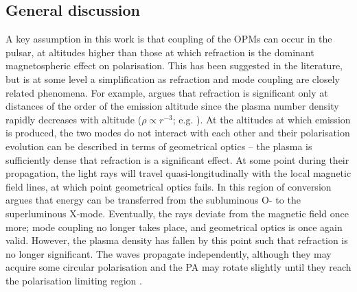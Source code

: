 







\subsection{General discussion}
\label{sec: B0031 - discuss - general discusison}

A key assumption in this work is that coupling of the OPMs can occur in the pulsar, at altitudes higher than those at which refraction is the dominant magnetospheric effect on polarisation. This has been suggested in the literature, but is at some level a simplification as refraction and mode coupling are closely related phenomena. For example, \citet{Pxxx2001} argues that refraction is significant only at distances of the order of the emission altitude since the plasma number density rapidly decreases with altitude ($\rho \propto r^{-3}$; e.g. \citealt{RSxx1975}).
At the altitudes at which emission is produced, the two modes do not interact with each other and their polarisation evolution can be described in terms of geometrical optics -- the plasma is sufficiently dense that refraction is a significant effect. At some point during their propagation, the light rays will travel quasi-longitudinally with the local magnetic field lines, at which point geometrical optics fails. In this region of conversion \citet{Pxxx2001} argues that energy can be transferred from the subluminous O- to the superluminous X-mode. Eventually, the rays deviate from the magnetic field once more; mode coupling no longer takes place, and geometrical optics is once again valid. However, the plasma density has fallen by this point such that refraction is no longer significant. The waves propagate independently, although they may acquire some circular polarisation and the PA may rotate slightly until they reach the polarisation limiting region \citep{PLxx2000, Pxxx2001}.


